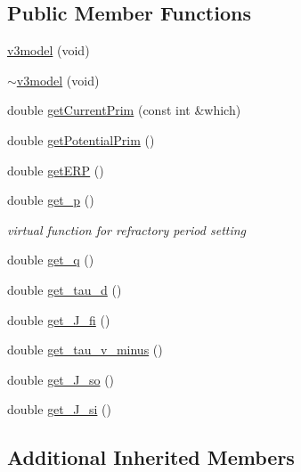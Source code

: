 \subsection*{Public Member Functions}
\begin{DoxyCompactItemize}
\item 
\hyperlink{classv3model_aa3c5a02561c2a8e14f80b599f35c8be3}{v3model} (void)
\item 
\hyperlink{classv3model_a78cbf845aa6ab504372a8710cad28f4b}{$\sim$v3model} (void)
\item 
double \hyperlink{classv3model_a14957985c821508b7a5985a423d0c942}{get\+Current\+Prim} (const int \&which)
\item 
double \hyperlink{classv3model_a7db295a02c2487b6eb4d13e6e942a088}{get\+Potential\+Prim} ()
\item 
double \hyperlink{classv3model_aeb8db7e7f6327e341b73ce6ee22c888a}{get\+E\+R\+P} ()
\item 
double \hyperlink{classv3model_a18cfce2a9bc0536157da81cef399706a}{get\+\_\+p} ()
\begin{DoxyCompactList}\small\item\em virtual function for refractory period setting \end{DoxyCompactList}\item 
double \hyperlink{classv3model_ad969fd48215103f85ce383f11d759c99}{get\+\_\+q} ()
\item 
double \hyperlink{classv3model_a78dfba3662698b7967b683b975f473bb}{get\+\_\+tau\+\_\+d} ()
\item 
double \hyperlink{classv3model_a697f47117c9921dcb0e6da322a41ed1a}{get\+\_\+\+J\+\_\+fi} ()
\item 
double \hyperlink{classv3model_a1eb045a08d91e3677e25c298044046df}{get\+\_\+tau\+\_\+v\+\_\+minus} ()
\item 
double \hyperlink{classv3model_a0e4cf672a486a8334967c880606925a9}{get\+\_\+\+J\+\_\+so} ()
\item 
double \hyperlink{classv3model_ac852daced9f1246ce321d8245320b345}{get\+\_\+\+J\+\_\+si} ()
\end{DoxyCompactItemize}
\subsection*{Additional Inherited Members}


